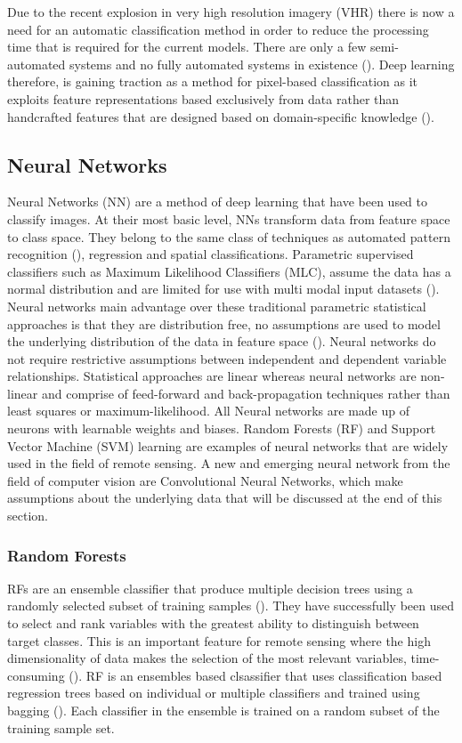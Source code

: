 \par
Due to the recent explosion in very high resolution imagery (VHR) there is now a need for an automatic classification method in order to reduce the processing time that is required for the current models. There are only a few semi-automated systems and no fully automated systems in existence (\cite{baltsavias04,mayer08,mnih13}). Deep learning therefore, is gaining traction as a method for pixel-based classification as it exploits feature representations based exclusively from data rather than handcrafted features that are designed based on domain-specific knowledge (\cite{xiao17,maggiori17a}). 
\paragraph{}
\subsection*{Neural Networks}
Neural Networks (NN) are a method of deep learning that have been used to classify images. At their most basic level, NNs transform data from feature space to class space. They belong to the same class of techniques as automated pattern recognition (\cite{Ritter89}), regression and spatial classifications. Parametric supervised classifiers such as Maximum Likelihood Classifiers (MLC), assume the data has a normal distribution and are limited for use with multi modal input datasets (\cite{Liu11}). Neural networks main advantage over these traditional parametric statistical approaches is that they are distribution free, no assumptions are used to model the underlying distribution of the data in feature space (\cite{Patricia97}). Neural networks do not require restrictive assumptions between independent and dependent variable relationships. Statistical approaches are linear whereas neural networks are non-linear and comprise of feed-forward and back-propagation techniques rather than least squares or maximum-likelihood. All Neural networks are made up of neurons with learnable weights and biases. Random Forests (RF) and Support Vector Machine (SVM) learning are examples of neural networks that are widely used in the field of remote sensing. A new and emerging neural network from the field of computer vision are Convolutional Neural Networks, which make assumptions about the underlying data that will be discussed at the end of this section. 
\subsubsection{Random Forests}
RFs are an ensemble classifier that produce multiple decision trees using a randomly selected subset of training samples (\cite{Breiman01}). They have successfully been used to select and rank variables with the greatest ability to distinguish between target classes. This is an important feature for remote sensing where the high dimensionality of data makes the selection of the most relevant variables, time-consuming (\cite{belgiu16}). RF is an ensembles based clsassifier that uses classification based regression trees based on individual or multiple classifiers and trained using bagging (\cite{belgiu16}). Each classifier in the ensemble is trained on a random subset of the training sample set.

